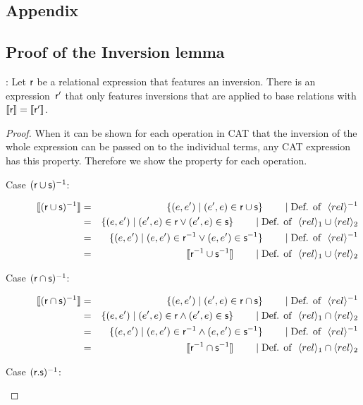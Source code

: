 \documentclass[a4paper,twoside,12pt, english]{article}
\begin{document}
\begin{appendix}
\section{Appendix}
\subsection{Proof of the Inversion lemma}\label{sec:inversionproof}
:
Let $\relr$ be a relational expression that features an inversion. There is an expression~$\relr'$ that only features inversions that are applied to base relations with $\semsof{\relr} = \semsof{\relr'}$. 
\begin{proof}
When it can be shown for each operation in CAT that the inversion of the whole expression can be passed on to the individual terms, any CAT expression has this property. Therefore we show the property for each operation.
\begin{description}
\item[Case $(\relr \cup \rels)^\inv$:] 
\begin{eqnarray*}
\semsof{(\relr \cup \rels)^{-1}} &= &\{(e,e') \mid (e',e) \in \relr \cup \rels\} \reason{\defof \rel^{-1}} \\
&= &\{(e,e') \mid (e',e) \in \relr \lor (e',e) \in \rels\} \reason{\defof \rel_1 \cup \rel_2} \\
&= &\{(e,e') \mid \edgein \relr^{-1} \lor \edgein \rels^\inv\} \reason{\defof \rel^\inv} \\
&= &\semsof{\relr^{-1} \cup \rels^{-1}} \reason{\defof \rel_1 \cup \rel_2}
\end{eqnarray*}
\item[Case $(\relr \cap \rels)^\inv$:] 
\begin{eqnarray*}
\semsof{(\relr \cap \rels)^{-1}} &= &\{(e,e') \mid (e',e) \in \relr\cap \rels\} \reason{\defof \rel^\inv}\\
&= &\{(e,e') \mid (e',e) \in \relr \land (e',e) \in \rels\} \reason{\defof \rel_1 \cap \rel_2} \\
&= &\{(e,e') \mid \edgein \relr^\inv \land \edgein \rels^\inv\} \reason{\defof \rel^\inv}\\
&= &\semsof{\relr^{-1} \cap \rels^{-1}} \reason{\defof \rel_1 \cap \rel_2}
\end{eqnarray*}
\item[Case $(\relr.\rels)^\inv$:] 

\end{description}
\end{proof}
\end{appendix}
\end{document}
